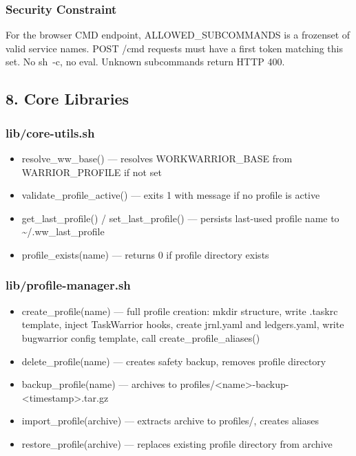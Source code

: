 \documentclass[11pt, a4paper, DIV=14]{scrartcl}
\renewcommand{\texttt}[1]{{\ttfamily\fontsize{8.5}{10.5}\selectfont\color{BabbNavy}#1}}
\let\origRule\rule
\renewcommand{\rule}[2]{\par\noindent{\color{BabbBorder}\origRule{#1}{#2}}\par}
\begin{document}
\subsubsection{Security Constraint}\label{security-constraint}

For the browser CMD endpoint, \texttt{ALLOWED\_SUBCOMMANDS} is a
frozenset of valid service names. POST /cmd requests must have a first
token matching this set. No \texttt{sh\ -c}, no eval. Unknown
subcommands return HTTP 400.

\begin{center}\rule{0.5\linewidth}{0.5pt}\end{center}

\subsection{8. Core Libraries}\label{core-libraries}

\subsubsection{lib/core-utils.sh}\label{libcore-utils.sh}

\begin{itemize}
\tightlist
\item
  \texttt{resolve\_ww\_base()} --- resolves \texttt{WORKWARRIOR\_BASE}
  from \texttt{WARRIOR\_PROFILE} if not set
\item
  \texttt{validate\_profile\_active()} --- exits 1 with message if no
  profile is active
\item
  \texttt{get\_last\_profile()} / \texttt{set\_last\_profile()} ---
  persists last-used profile name to
  \texttt{\textasciitilde{}/.ww\_last\_profile}
\item
  \texttt{profile\_exists(name)} --- returns 0 if profile directory
  exists
\end{itemize}

\subsubsection{lib/profile-manager.sh}\label{libprofile-manager.sh}

\begin{itemize}
\tightlist
\item
  \texttt{create\_profile(name)} --- full profile creation: mkdir
  structure, write \texttt{.taskrc} template, inject TaskWarrior hooks,
  create \texttt{jrnl.yaml} and \texttt{ledgers.yaml}, write bugwarrior
  config template, call \texttt{create\_profile\_aliases()}
\item
  \texttt{delete\_profile(name)} --- creates safety backup, removes
  profile directory
\item
  \texttt{backup\_profile(name)} --- archives to
  \texttt{profiles/\textless{}name\textgreater{}-backup-\textless{}timestamp\textgreater{}.tar.gz}
\item
  \texttt{import\_profile(archive)} --- extracts archive to
  \texttt{profiles/}, creates aliases
\item
  \texttt{restore\_profile(archive)} --- replaces existing profile
  directory from archive
\end{itemize}
\end{document}
